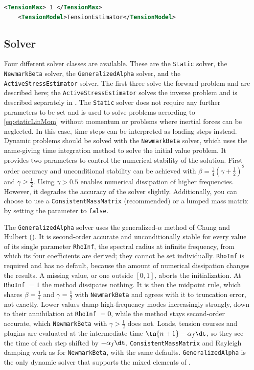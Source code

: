 \begin{lstlisting}[language=XML,caption=.xml settings for the TensionEstimator tension model]
    <TensionMax> 1 </TensionMax>
    <TensionModel>TensionEstimator</TensionModel>
\end{lstlisting}

\subsection{Solver}
\label{settings:Solver}

Four different solver classes are available.
These are the \verb|Static| solver, the \verb|NewmarkBeta| solver, the \verb|GeneralizedAlpha| solver, and the \verb|ActiveStressEstimator| solver.
The first three solve the forward problem and are described here; the \verb|ActiveStressEstimator| solves the inverse problem and is described separately in .
The \verb|Static| solver does not require any further parameters to be set and is used to solve problems according to \autoref{eq:staticLinMom} without momentum or problems where inertial forces can be neglected.
In this case, time steps can be interpreted as loading steps instead.
Dynamic problems should be solved with the \verb|NewmarkBeta| solver, which uses the name-giving time integration method to solve the initial value problem.
It provides two parameters to control the numerical stability of the solution.
First order accuracy and unconditional stability can be achieved with $\beta = \frac{1}{4}(\gamma + \frac{1}{2})^2$ and $\gamma \geq \frac{1}{2}$.
Using $\gamma > 0.5$ enables numerical dissipation of higher frequencies.
However, it degrades the accuracy of the solver slightly.
Additionally, you can choose to use a \verb|ConsistentMassMatrix| (recommended) or a lumped mass matrix by setting the parameter to \verb|false|.

The \verb|GeneralizedAlpha| solver uses the generalized-$\alpha$ method of Chung and Hulbert \cite{chung1993} ().
It is second-order accurate and unconditionally stable for every value of its single parameter \verb|RhoInf|, the spectral radius at infinite frequency, from which its four coefficients are derived; they cannot be set individually.
\verb|RhoInf| is required and has no default, because the amount of numerical dissipation changes the results.
A missing value, or one outside $[0, 1]$, aborts the initialization.
At \verb|RhoInf| $= 1$ the method dissipates nothing.
It is then the midpoint rule, which shares $\beta = \frac{1}{4}$ and $\gamma = \frac{1}{2}$ with \verb|NewmarkBeta| and agrees with it to truncation error, not exactly.
Lower values damp high-frequency modes increasingly strongly, down to their annihilation at \verb|RhoInf| $= 0$, while the method stays second-order accurate, which \verb|NewmarkBeta| with $\gamma > \frac{1}{2}$ does not.
Loads, tension courses and plugins are evaluated at the intermediate time $\tn{n+1} - \alpha_f \dt$, so they see the time of each step shifted by $-\alpha_f \dt$.
\verb|ConsistentMassMatrix| and Rayleigh damping work as for \verb|NewmarkBeta|, with the same defaults.
\verb|GeneralizedAlpha| is the only dynamic solver that supports the mixed elements of .

